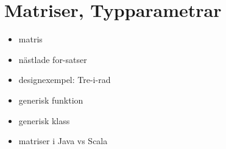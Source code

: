 \chapter{Matriser, Typparametrar}\label{chapter:W09}
\begin{multicols}{2}\begin{itemize}[nosep,label={$\square$}]
\item matris
\item nästlade for-satser
\item designexempel: Tre-i-rad
\item generisk funktion
\item generisk klass
\item matriser i Java vs Scala\end{itemize}\end{multicols}
